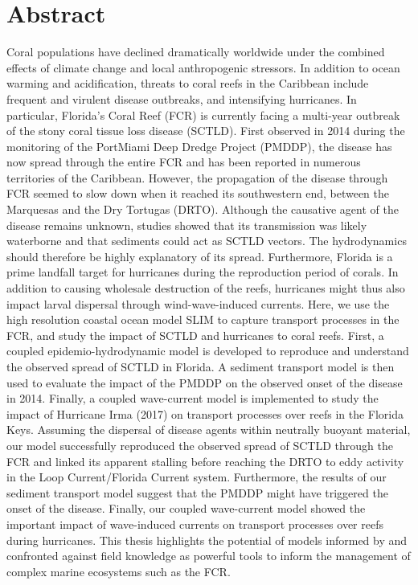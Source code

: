 
\chapter*{Abstract}

Coral populations have declined dramatically worldwide under the combined effects of climate change and local anthropogenic stressors. In addition to ocean warming and acidification, threats to coral reefs in the Caribbean include frequent and virulent disease outbreaks, and intensifying hurricanes. In particular, Florida's Coral Reef (FCR) is currently facing a multi-year outbreak of the stony coral tissue loss disease (SCTLD). First observed in 2014 during the monitoring of the PortMiami Deep Dredge Project (PMDDP), the disease has now spread through the entire FCR and has been reported in numerous territories of the Caribbean. However, the propagation of the disease through FCR seemed to slow down when it reached its southwestern end, between the Marquesas and the Dry Tortugas (DRTO). Although the causative agent of the disease remains unknown, studies showed that its transmission was likely waterborne and that sediments could act as SCTLD vectors. The hydrodynamics should therefore be highly explanatory of its spread. Furthermore, Florida is a prime landfall target for hurricanes during the reproduction period of corals. In addition to causing wholesale destruction of the reefs, hurricanes might thus also impact larval dispersal through wind-wave-induced currents. Here, we use the high resolution coastal ocean model SLIM to capture transport processes in the FCR, and study the impact of SCTLD and hurricanes to coral reefs. First, a coupled epidemio-hydrodynamic model is developed to reproduce and understand the observed spread of SCTLD in Florida. A sediment transport model is then used to evaluate the impact of the PMDDP on the observed onset of the disease in 2014. Finally, a coupled wave-current model is implemented to study the impact of Hurricane Irma (2017) on transport processes over reefs in the Florida Keys. Assuming the dispersal of disease agents within neutrally buoyant material, our model successfully reproduced the observed spread of SCTLD through the FCR and linked its apparent stalling before reaching the DRTO to eddy activity in the Loop Current/Florida Current system. Furthermore, the results of our sediment transport model suggest that the PMDDP might have triggered the onset of the disease. Finally, our coupled wave-current model showed the important impact of wave-induced currents on transport processes over reefs during hurricanes. This thesis highlights the potential of models informed by and confronted against field knowledge as powerful tools to inform the management of complex marine ecosystems such as the FCR.